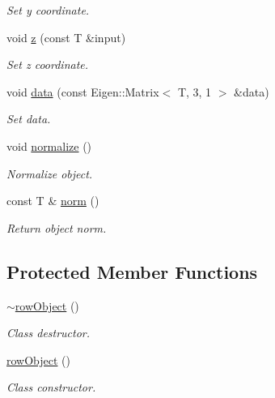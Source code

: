 \begin{DoxyCompactItemize}
\begin{DoxyCompactList}\small\item\em Set y coordinate. \end{DoxyCompactList}\item 
void \hyperlink{classddd_1_1row_object_a42c5766595f9ccb58435d97b8a9e0612}{z} (const T \&input)
\begin{DoxyCompactList}\small\item\em Set z coordinate. \end{DoxyCompactList}\item 
void \hyperlink{classddd_1_1row_object_ae90cbcdfbe32788d18f051a78f8188a6}{data} (const Eigen\+::\+Matrix$<$ T, 3, 1 $>$ \&data)
\begin{DoxyCompactList}\small\item\em Set data. \end{DoxyCompactList}\item 
\mbox{\label{classddd_1_1row_object_ad567bf2ca914b05a544b73bcec70cc57}} 
void \hyperlink{classddd_1_1row_object_ad567bf2ca914b05a544b73bcec70cc57}{normalize} ()
\begin{DoxyCompactList}\small\item\em Normalize object. \end{DoxyCompactList}\item 
\mbox{\label{classddd_1_1row_object_a69bc3d34442348bb58921d89d9721f19}} 
const T \& \hyperlink{classddd_1_1row_object_a69bc3d34442348bb58921d89d9721f19}{norm} ()
\begin{DoxyCompactList}\small\item\em Return object norm. \end{DoxyCompactList}\end{DoxyCompactItemize}
\subsection*{Protected Member Functions}
\begin{DoxyCompactItemize}
\item 
\mbox{\label{classddd_1_1row_object_a7fcccccb1222a93ccaacca70e8faa9d3}} 
\hyperlink{classddd_1_1row_object_a7fcccccb1222a93ccaacca70e8faa9d3}{$\sim$row\+Object} ()
\begin{DoxyCompactList}\small\item\em Class destructor. \end{DoxyCompactList}\item 
\mbox{\label{classddd_1_1row_object_ae5fe7e1a78443beb05189475fb4af63e}} 
\hyperlink{classddd_1_1row_object_ae5fe7e1a78443beb05189475fb4af63e}{row\+Object} ()
\begin{DoxyCompactList}\small\item\em Class constructor. \end{DoxyCompactList}\end{DoxyCompactItemize}


